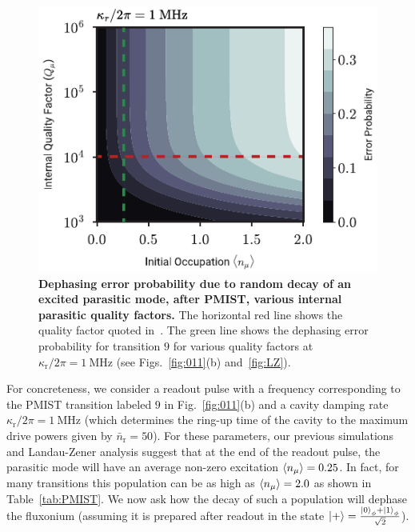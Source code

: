 \documentclass[%
reprint,
superscriptaddress,
 amsmath,amssymb,
 aps,
 prx,
longbibliography,
floatfix,
]{revtex4-2}
\begin{document}
\begin{figure}[htb]
    \centering
    \includegraphics[width=\linewidth]{Figures/dephasing.pdf}
    \caption{{\bf Dephasing error probability due to random decay of an excited parasitic mode, after PMIST, various internal parasitic quality factors.} The horizontal red line shows the quality factor quoted in~\cite{masluk_microwave_2012}. The green line shows the dephasing error probability for transition $9$ for various quality factors at $\kappa_\textrm{r}/2\pi=1 \ \mathrm{MHz}$ (see Figs.~\ref{fig:011}(b) and~\ref{fig:LZ}).}
    \label{fig:dephasing}
\end{figure}

For concreteness, we consider a readout pulse with a frequency corresponding to the PMIST transition labeled $9$ in Fig.~\ref{fig:011}(b) and a cavity damping rate $\kappa_\textrm{r}/2\pi=1 \ \mathrm{MHz}$ (which determines the ring-up time of the cavity to the maximum drive powers given by $\bar n_\textrm{r}=50$). For these parameters, our previous simulations and Landau-Zener analysis suggest that at the end of the readout pulse, the parasitic mode will have an average non-zero excitation $\braket{n_\mu}=0.25$. In fact, for many transitions this population can be as high as $\braket{n_\mu}=2.0$ as shown in Table~\ref{tab:PMIST}. We now ask how the decay of such a population will dephase the fluxonium (assuming it is prepared after readout in the state $\ket{+}=\frac{\ket{0}_\phi+\ket{1}_\phi}{\sqrt{2}}$).
\end{document}
